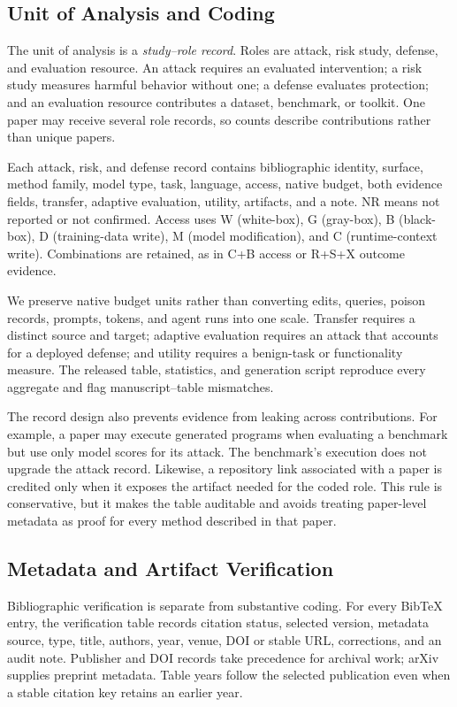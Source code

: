 \documentclass[acmsmall,screen,review]{acmart}
\begin{document}
\subsection{Unit of Analysis and Coding}
The unit of analysis is a \emph{study--role record}. Roles are attack, risk study, defense, and evaluation resource. An attack requires an evaluated intervention; a risk study measures harmful behavior without one; a defense evaluates protection; and an evaluation resource contributes a dataset, benchmark, or toolkit. One paper may receive several role records, so counts describe contributions rather than unique papers.

Each attack, risk, and defense record contains bibliographic identity, surface, method family, model type, task, language, access, native budget, both evidence fields, transfer, adaptive evaluation, utility, artifacts, and a note. \textsf{NR} means not reported or not confirmed. Access uses \textsf{W} (white-box), \textsf{G} (gray-box), \textsf{B} (black-box), \textsf{D} (training-data write), \textsf{M} (model modification), and \textsf{C} (runtime-context write). Combinations are retained, as in \textsf{C+B} access or \textsf{R+S+X} outcome evidence.

We preserve native budget units rather than converting edits, queries, poison records, prompts, tokens, and agent runs into one scale. Transfer requires a distinct source and target; adaptive evaluation requires an attack that accounts for a deployed defense; and utility requires a benign-task or functionality measure. The released table, statistics, and generation script reproduce every aggregate and flag manuscript--table mismatches.

The record design also prevents evidence from leaking across contributions. For example, a paper may execute generated programs when evaluating a benchmark but use only model scores for its attack. The benchmark's execution does not upgrade the attack record. Likewise, a repository link associated with a paper is credited only when it exposes the artifact needed for the coded role. This rule is conservative, but it makes the table auditable and avoids treating paper-level metadata as proof for every method described in that paper.

\subsection{Metadata and Artifact Verification}
Bibliographic verification is separate from substantive coding. For every BibTeX entry, the verification table records citation status, selected version, metadata source, type, title, authors, year, venue, DOI or stable URL, corrections, and an audit note. Publisher and DOI records take precedence for archival work; arXiv supplies preprint metadata. Table years follow the selected publication even when a stable citation key retains an earlier year.
\end{document}
